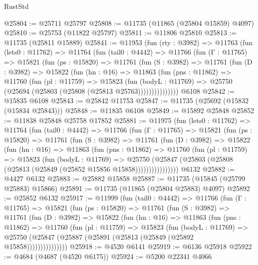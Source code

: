 \begin{lexlean}{RustStd}
\begin{coremodule}
@25804 := @25711 @25797
@25808 := @11735 (@11865 (@25804 @15859) @4097)
@25810 := @25753 (@11822 @25797)
@25811 := @11806 @25810
@25813 := @11735 (@25811 @15889)
@25841 := @11953
    (fun (rty : @3982) =>
    @11763
      (fun (lets0 : @11762) =>
      @11764
        (fun (tail0 : @4442) =>
        @11766
          (fun (Γ : @11765) =>
          @15821
            (fun (ps : @15820) =>
            @11761
              (fun (S : @3982) =>
              @11761
                (fun (D : @3982) =>
                @15822
                  (fun (hn : @16) =>
                  @11863
                    (fun (pns : @11862) =>
                    @11760
                      (fun (pl : @11759) =>
                      @15823
                        (fun (bodyL : @11769) =>
                        @25750 (@25694 (@25803 (@25808 (@25813 @25763)))))))))))))))
    @6108
@25842 := @15835 @6108
@25843 := @25842 @11753
@25847 := @11735 (@25692 (@15832 (@15834 @25843)))
@25848 := @11835 @6108
@25849 := @15892 @25848
@25852 := @11838 @25848 @25758 @17852
@25881 := @11975
    (fun (lets0 : @11762) =>
    @11764
      (fun (tail0 : @4442) =>
      @11766
        (fun (Γ : @11765) =>
        @15821
          (fun (ps : @15820) =>
          @11761
            (fun (S : @3982) =>
            @11761
              (fun (D : @3982) =>
              @15822
                (fun (hn : @16) =>
                @11863
                  (fun (pns : @11862) =>
                  @11760
                    (fun (pl : @11759) =>
                    @15823
                      (fun (bodyL : @11769) =>
                      @25750
                        (@25847
                          (@25803 (@25808 (@25813 (@25849 (@25852 @15856 @15858))))))))))))))))
    @6132
@25882 := @4427 @6132
@25883 := @25882 @15858
@25887 := @11735 (@15845 (@25799 @25883) @15866)
@25891 := @11735 (@11865 (@25804 @25883) @4097)
@25892 := @25852 @6132
@25917 := @11999
    (fun (tail0 : @4442) =>
    @11766
      (fun (Γ : @11765) =>
      @15821
        (fun (ps : @15820) =>
        @11761
          (fun (S : @3982) =>
          @11761
            (fun (D : @3982) =>
            @15822
              (fun (hn : @16) =>
              @11863
                (fun (pns : @11862) =>
                @11760
                  (fun (pl : @11759) =>
                  @15823
                    (fun (bodyL : @11769) =>
                    @25750 (@25847 (@25887 (@25891 (@25813 (@25849 (@25892 @15858)))))))))))))))
@25918 := @4520 @6141
@25919 := @6136 @25918
@25922 := @4684 (@4687 (@4520 @6175))
@25924 := @5200 @22341 @4066

\end{coremodule}
\end{lexlean}

